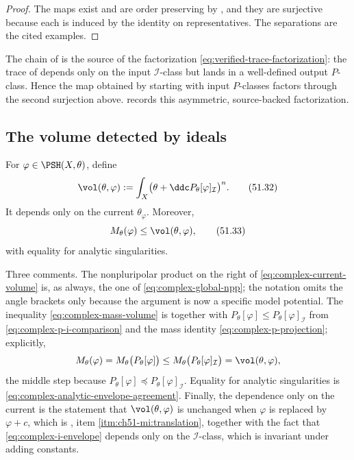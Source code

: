 \begin{proof}
The maps exist and are order preserving by
, and they are surjective because
each is induced by the identity on representatives.  The separations are
the cited examples.
\end{proof}

The chain of  is the source of the
factorization \eqref{eq:verified-trace-factorization}: the trace of
 depends only on the input
\(\mathcal I\)-class but lands in a well-defined output \(P\)-class.
Hence the map obtained by starting with input \(P\)-classes factors through
the second surjection above.  
records this asymmetric, source-backed factorization.

\subsection{The volume detected by ideals}
\label{sec:ch51-current-volume}

\begin{definition}
\label{def:complex-current-volume}
For \(\varphi\in\PSH(X,\theta)\), define
\[
 \vol(\theta,\varphi)
 :=\int_X\bigl(\theta+\ddc
             P_\theta[\varphi]_{\mathcal I}\bigr)^n.
\tag{51.32}\label{eq:complex-current-volume}
\]
It depends only on the current \(\theta_\varphi\).  Moreover,
\[
 M_\theta(\varphi)\leq\vol(\theta,\varphi),
\tag{51.33}\label{eq:complex-mass-volume}
\]
with equality for analytic singularities.
\end{definition}

Three comments.  The nonpluripolar product on the right of
\eqref{eq:complex-current-volume} is, as always, the one of
\eqref{eq:complex-global-npp}; the notation omits the angle brackets only
because the argument is now a specific model potential.  The inequality
\eqref{eq:complex-mass-volume} is
 together with
\(P_\theta[\varphi]\leq P_\theta[\varphi]_{\mathcal I}\) from
\eqref{eq:complex-p-i-comparison} and the mass identity
\eqref{eq:complex-p-projection}; explicitly,
\[
 M_\theta(\varphi)
 =M_\theta\bigl(P_\theta[\varphi]\bigr)
 \leq M_\theta\bigl(P_\theta[\varphi]_{\mathcal I}\bigr)
 =\vol(\theta,\varphi),
\]
the middle step because \(P_\theta[\varphi]\preceq
P_\theta[\varphi]_{\mathcal I}\).  Equality for analytic singularities is
\eqref{eq:complex-analytic-envelope-agreement}.  Finally, the dependence
only on the current is the statement that
\(\vol(\theta,\varphi)\) is unchanged when \(\varphi\) is replaced by
\(\varphi+c\), which is
, item
\cref{itm:ch51-mi:translation}, together with the fact that
\eqref{eq:complex-i-envelope} depends only on the
\(\mathcal I\)-class, which is invariant under adding constants.

